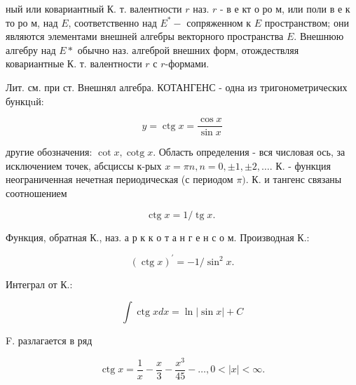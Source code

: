\documentclass[10pt]{article}
\begin{document}
ный или ковариантный К. т. валентности $r$ наз. $r$ - в е кт о ро м, или поли в е к то ро м, над $E$, соответственно над $E^{*}-$ сопряженном к $E$ пространством; они являются элементами внешней алгебры векторного пространства $E$. Внешнюю алгебру над $E *$ обычно наз. алгеброй внешних форм, отождествляя ковариантные К. т. валентности $r$ с $r$-формами.



Лит. см. при ст. Внешнял алгебра. КОТАНГЕНС - одна из тригонометрических бункцuй:



\[

y=\operatorname{ctg} x=\frac{\cos x}{\sin x}

\]



другие обозначения: $\cot x, \operatorname{cotg} x$. Область определения - вся числовая ось, за исключением точек, абсциссы к-рых $x=\pi n, n=0, \pm 1, \pm 2, \ldots$. К. - функция неограниченная нечетная периодическая (с периодом $\pi)$. К. и тангенс связаны соотношением



\[

\operatorname{ctg} x=1 / \operatorname{tg} x \text {. }

\]



Функция, обратная К., наз. а р к к о т а н г е н с о м. Производная К.:



\[

(\operatorname{ctg} x)^{\prime}=-1 / \sin ^{2} x .

\]



Интеграл от К.:



\[

\int \operatorname{ctg} x d x=\ln |\sin x|+C

\]



F. разлагается в ряд



\[

\operatorname{ctg} x=\frac{1}{x}-\frac{x}{3}-\frac{x^{3}}{45}-\ldots, 0<|x|<\infty .

\]
\end{document}
